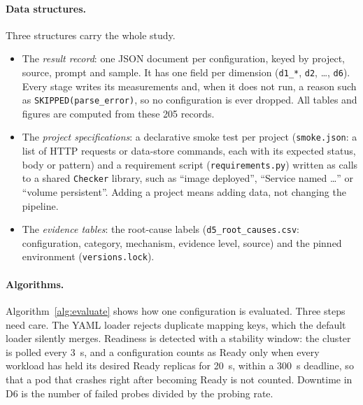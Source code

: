 \paragraph{Data structures.} Three structures carry the whole study.
\begin{itemize}
\item The \emph{result record}: one JSON document per configuration, keyed by project, source, prompt and sample. It has one field per dimension (\texttt{d1\_*}, \texttt{d2}, \ldots, \texttt{d6}). Every stage writes its measurements and, when it does not run, a reason such as \texttt{SKIPPED(parse\_error)}, so no configuration is ever dropped. All tables and figures are computed from these 205 records.
\item The \emph{project specifications}: a declarative smoke test per project (\texttt{smoke.json}: a list of HTTP requests or data-store commands, each with its expected status, body or pattern) and a requirement script (\texttt{requirements.py}) written as calls to a shared \texttt{Checker} library, such as ``image deployed'', ``Service named \ldots'' or ``volume persistent''. Adding a project means adding data, not changing the pipeline.
\item The \emph{evidence tables}: the root-cause labels (\texttt{d5\_root\_causes.csv}: configuration, category, mechanism, evidence level, source) and the pinned environment (\texttt{versions.lock}).
\end{itemize}

\paragraph{Algorithms.} Algorithm~\ref{alg:evaluate} shows how one configuration is evaluated. Three steps need care. The YAML loader rejects duplicate mapping keys, which the default loader silently merges. Readiness is detected with a stability window: the cluster is polled every 3~s, and a configuration counts as Ready only when every workload has held its desired Ready replicas for 20~s, within a 300~s deadline, so that a pod that crashes right after becoming Ready is not counted. Downtime in D6 is the number of failed probes divided by the probing rate.

